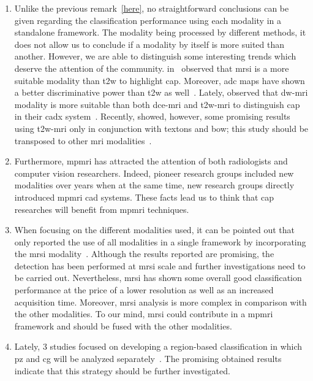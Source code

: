 \begin{enumerate}
\item Unlike the previous remark~\ref{here}, no straightforward conclusions can
  be given regarding the classification performance using each modality in a
  standalone framework.
The modality being processed by different methods, it does not allow us to
conclude if a modality by itself is more suited than another.
However, we are able to distinguish some interesting trends which deserve the
attention of the community.
\citeauthor{Tiwari2013} in~\cite{Tiwari2009a,Tiwari2012,Tiwari2013} observed
that \ac{mrsi} is a more suitable modality than \ac{t2w} to highlight
\ac{cap}.
Moreover, \ac{adc} maps have shown a better discriminative power than \ac{t2w}
as well~\cite{Langer2009,Viswanath2011,Peng2013}.
Lately, \citeauthor{Litjens2014} observed that \ac{dw}-\ac{mri} modality is
more suitable than both \ac{dce}-\ac{mri} and \ac{t2w}-\ac{mri} to distinguish
\ac{cap} in their \ac{cadx} system~\cite{Litjens2014}.
Recently, \citeauthor{rampun2016computerb} showed, however, some promising
results using \ac{t2w}-\ac{mri} only in conjunction with textons and \ac{bow};
this study should be transposed to other \ac{mri}
modalities~\cite{rampun2016computerb}.

\item Furthermore, \ac{mpmri} has attracted the attention of both radiologists
  and computer vision researchers.
Indeed, pioneer research groups included new modalities over years when at the
same time, new research groups directly introduced \ac{mpmri} \ac{cad}
systems.
These facts lead us to think that \ac{cap} researches will benefit from
\ac{mpmri} techniques.

\item When focusing on the different modalities used, it can be pointed out
  that only \citeauthor{trigui2017automatic} reported the use of all modalities
  in a single framework by incorporating the \ac{mrsi}
  modality~\cite{trigui2016classification,trigui2017automatic}.
Although the results reported are promising, the detection has been performed
at \ac{mrsi} scale and further investigations need to be carried out.
Nevertheless, \ac{mrsi} has shown some overall good classification performance
at the price of a lower resolution as well as an increased acquisition time.
Moreover, \ac{mrsi} analysis is more complex in comparison with the other
modalities.
To our mind, \ac{mrsi} could contribute in a \ac{mpmri} framework and should be
fused with the other modalities.

\item Lately, 3 studies focused on developing a region-based classification in
  which \ac{pz} and \ac{cg} will be analyzed
  separately~\cite{Viswanath2012,Litjens2012,Litjens2014}.
The promising obtained results indicate that this strategy should be further
investigated.


\end{enumerate}
